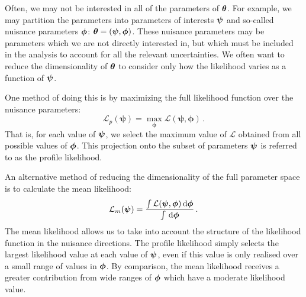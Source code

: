 Often, we may not be interested in all of the parameters of $\boldsymbol\theta$. For example, we may partition the parameters into parameters of interests $\boldsymbol\psi$ and so-called nuisance parameters $\boldsymbol\phi$: $\boldsymbol\theta = (\boldsymbol\psi, \boldsymbol\phi)$. These nuisance parameters may be parameters which we are not directly interested in, but which must be included in the analysis to account for all the relevant uncertainties. We often want to reduce the dimensionality of $\boldsymbol\theta$ to consider only how the likelihood varies as a function of $\boldsymbol\psi$. 

One method of doing this is by maximizing the full likelihood function over the nuisance parameters:
\begin{equation}
\label{eq:parameter:profilelikelihood}
\mathcal{L}_p(\boldsymbol{\psi}) = \max_{\boldsymbol{\phi}} \mathcal{L}(\boldsymbol{\psi},\boldsymbol{\phi})\,.
\end{equation}
That is, for each value of $\boldsymbol\psi$, we select the maximum value of $\mathcal{L}$ obtained from all possible values of $\boldsymbol\phi$. This projection onto the subset of parameters $\boldsymbol\psi$ is referred to as the profile likelihood.

An alternative method of reducing the dimensionality of the full parameter space is to calculate the mean likelihood:
\begin{equation}
\label{eq:parameter:meanlikelihood}
\mathcal{L}_m(\boldsymbol{\psi}) = \frac{\int \mathcal{L}(\boldsymbol\psi, \boldsymbol\phi) \, \mathrm{d}\boldsymbol\phi}{\int \, \mathrm{d}\boldsymbol\phi}\,.
\end{equation}
The mean likelihood allows us to take into account the structure of the likelihood function in the nuisance directions. The profile likelihood simply selects the largest likelihood value at each value of $\boldsymbol\psi$, even if this value is only realised over a small range of values in $\boldsymbol\phi$. By comparison, the mean likelihood receives a greater contribution from wide ranges of $\boldsymbol\phi$ which have a moderate likelihood value.

